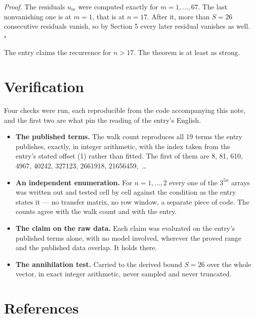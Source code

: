 \documentclass[11pt]{article}
\theoremstyle{definition}
\begin{document}
{\itshape Proof.} The residuals $u_m$ were computed exactly for $m = 1,\dots,67$. The last nonvanishing one is at $m = 1$, that is at $n = 17$. After it, more than $S = 26$ consecutive residuals vanish, so by Section 5 every later residual vanishes as well. $\square$

The entry claims the recurrence for $n > 17$. The theorem is at least as strong.

\section{Verification}

Four checks were run, each reproducible from the code accompanying this note, and the first two are what pin the reading of the entry's English.

\begin{itemize}

\item {\bfseries The published terms.} The walk count reproduces all 19 terms the entry publishes, exactly, in integer arithmetic, with the index taken from the entry's stated offset (1) rather than fitted. The first of them are 8, 81, 610, 4967, 40242, 327123, 2661918, 21656459,~\dots

\item {\bfseries An independent enumeration.} For $n = 1,\dots,2$ every one of the $3^{5n}$ arrays was written out and tested cell by cell against the condition as the entry states it --- no transfer matrix, no row window, a separate piece of code. The counts agree with the walk count and with the entry.

\item {\bfseries The claim on the raw data.} Each claim was evaluated on the entry's published terms alone, with no model involved, wherever the proved range and the published data overlap. It holds there.

\item {\bfseries The annihilation test.} Carried to the derived bound $S = 26$ over the whole vector, in exact integer arithmetic, never sampled and never truncated.

\end{itemize}

\section{References}
\end{document}
